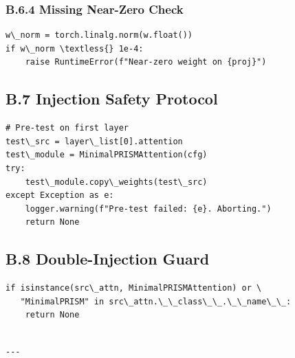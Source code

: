\subsubsection{B.6.4 Missing Near-Zero Check}

\begin{lstlisting}
w\_norm = torch.linalg.norm(w.float())
if w\_norm \textless{} 1e-4:
    raise RuntimeError(f"Near-zero weight on {proj}")
\end{lstlisting}

\subsection{B.7 Injection Safety Protocol}

\begin{lstlisting}
# Pre-test on first layer
test\_src = layer\_list[0].attention
test\_module = MinimalPRISMAttention(cfg)
try:
    test\_module.copy\_weights(test\_src)
except Exception as e:
    logger.warning(f"Pre-test failed: {e}. Aborting.")
    return None
\end{lstlisting}

\subsection{B.8 Double-Injection Guard}

\begin{lstlisting}
if isinstance(src\_attn, MinimalPRISMAttention) or \
   "MinimalPRISM" in src\_attn.\_\_class\_\_.\_\_name\_\_:
    return None
\end{lstlisting}
\begin{lstlisting}

---
\end{lstlisting}